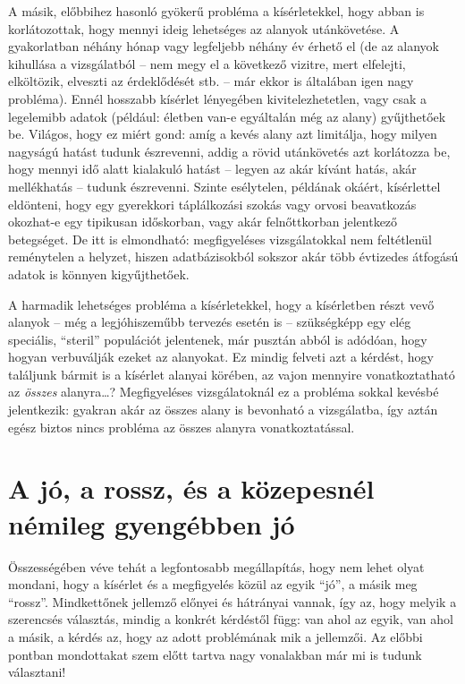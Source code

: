 \documentclass[magyar,]{book}
\begin{document}
A másik, előbbihez hasonló gyökerű probléma a kísérletekkel, hogy abban is korlátozottak, hogy mennyi ideig lehetséges az alanyok utánkövetése. A gyakorlatban néhány hónap vagy legfeljebb néhány év érhető el (de az alanyok kihullása a vizsgálatból -- nem megy el a következő vizitre, mert elfelejti, elköltözik, elveszti az érdeklődését stb. -- már ekkor is általában igen nagy probléma). Ennél hosszabb kísérlet lényegében kivitelezhetetlen, vagy csak a legelemibb adatok (például: életben van-e egyáltalán még az alany) gyűjthetőek be. Világos, hogy ez miért gond: amíg a kevés alany azt limitálja, hogy milyen nagyságú hatást tudunk észrevenni, addig a rövid utánkövetés azt korlátozza be, hogy mennyi idő alatt kialakuló hatást -- legyen az akár kívánt hatás, akár mellékhatás -- tudunk észrevenni. Szinte esélytelen, példának okáért, kísérlettel eldönteni, hogy egy gyerekkori táplálkozási szokás vagy orvosi beavatkozás okozhat-e egy tipikusan időskorban, vagy akár felnőttkorban jelentkező betegséget. De itt is elmondható: megfigyeléses vizsgálatokkal nem feltétlenül reménytelen a helyzet, hiszen adatbázisokból sokszor akár több évtizedes átfogású adatok is könnyen kigyűjthetőek.

A harmadik lehetséges probléma a kísérletekkel, hogy a kísérletben részt vevő alanyok -- még a legjóhiszeműbb tervezés esetén is -- szükségképp egy elég speciális, \enquote{steril} populációt jelentenek, már pusztán abból is adódóan, hogy hogyan verbuválják ezeket az alanyokat. Ez mindig felveti azt a kérdést, hogy találjunk bármit is a kísérlet alanyai körében, az vajon mennyire vonatkoztatható az \emph{összes} alanyra\ldots? Megfigyeléses vizsgálatoknál ez a probléma sokkal kevésbé jelentkezik: gyakran akár az összes alany is bevonható a vizsgálatba, így aztán egész biztos nincs probléma az összes alanyra vonatkoztatással.

\hypertarget{a-juxf3-a-rossz-uxe9s-a-kuxf6zepesnuxe9l-nuxe9mileg-gyenguxe9bben-juxf3}{%
\section{A jó, a rossz, és a közepesnél némileg gyengébben jó}\label{a-juxf3-a-rossz-uxe9s-a-kuxf6zepesnuxe9l-nuxe9mileg-gyenguxe9bben-juxf3}}

Összességében véve tehát a legfontosabb megállapítás, hogy nem lehet olyat mondani, hogy a kísérlet és a megfigyelés közül az egyik \enquote{jó}, a másik meg \enquote{rossz}. Mindkettőnek jellemző előnyei és hátrányai vannak, így az, hogy melyik a szerencsés választás, mindig a konkrét kérdéstől függ: van ahol az egyik, van ahol a másik, a kérdés az, hogy az adott problémának mik a jellemzői. Az előbbi pontban mondottakat szem előtt tartva nagy vonalakban már mi is tudunk választani!
\end{document}
